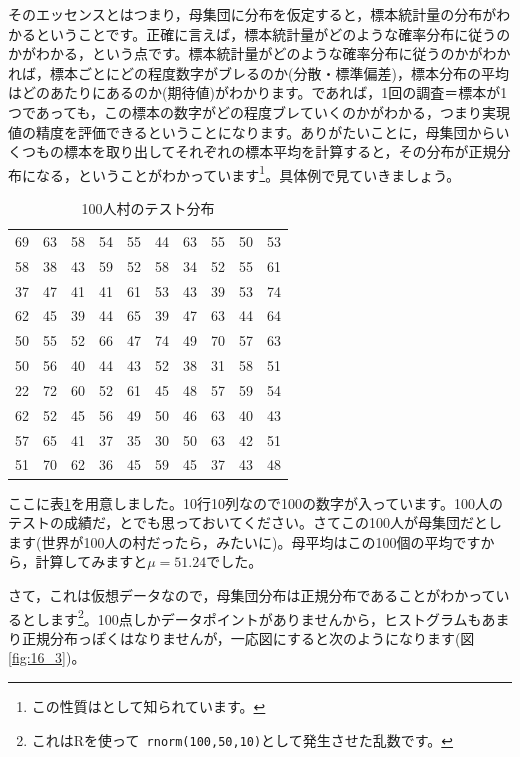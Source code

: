 \documentclass{ltjsbook}
\begin{document}
そのエッセンスとはつまり，母集団に分布を仮定すると，標本統計量の分布がわかるということです。正確に言えば，標本統計量がどのような確率分布に従うのかがわかる，という点です。標本統計量がどのような確率分布に従うのかがわかれば，標本ごとにどの程度数字がブレるのか(分散・標準偏差)，標本分布の平均はどのあたりにあるのか(期待値)がわかります。であれば，1回の調査＝標本が1つであっても，この標本の数字がどの程度ブレていくのかがわかる，つまり実現値の精度を評価できるということになります。ありがたいことに，母集団からいくつもの標本を取り出してそれぞれの標本平均を計算すると，その分布が正規分布になる，ということがわかっています\footnote{この性質はとして知られています。}。具体例で見ていきましょう。

\begin{table}[ht]
	\centering
	\caption{100人村のテスト分布}
	\begin{tabular}{rrrrrrrrrr}
		\hline
		69 & 63 & 58 & 54 & 55 & 44 & 63 & 55 & 50 & 53 \\
		58 & 38 & 43 & 59 & 52 & 58 & 34 & 52 & 55 & 61 \\
		37 & 47 & 41 & 41 & 61 & 53 & 43 & 39 & 53 & 74 \\
		62 & 45 & 39 & 44 & 65 & 39 & 47 & 63 & 44 & 64 \\
		50 & 55 & 52 & 66 & 47 & 74 & 49 & 70 & 57 & 63 \\
		50 & 56 & 40 & 44 & 43 & 52 & 38 & 31 & 58 & 51 \\
		22 & 72 & 60 & 52 & 61 & 45 & 48 & 57 & 59 & 54 \\
		62 & 52 & 45 & 56 & 49 & 50 & 46 & 63 & 40 & 43 \\
		57 & 65 & 41 & 37 & 35 & 30 & 50 & 63 & 42 & 51 \\
		51 & 70 & 62 & 36 & 45 & 59 & 45 & 37 & 43 & 48 \\
		\hline
	\end{tabular}
	\label{tbl::16_01}
\end{table}

ここに表\ref{tbl::16_01}を用意しました。10行10列なので100の数字が入っています。100人のテストの成績だ，とでも思っておいてください。さてこの100人が母集団だとします(世界が100人の村だったら，みたいに)。母平均はこの100個の平均ですから，計算してみますと$\mu=51.24$でした。

さて，これは仮想データなので，母集団分布は正規分布であることがわかっているとします\footnote{これはRを使って\texttt{ rnorm(100,50,10)}として発生させた乱数です。}。100点しかデータポイントがありませんから，ヒストグラムもあまり正規分布っぽくはなりませんが，一応図にすると次のようになります(図\ref{fig:16_3})。
\end{document}
